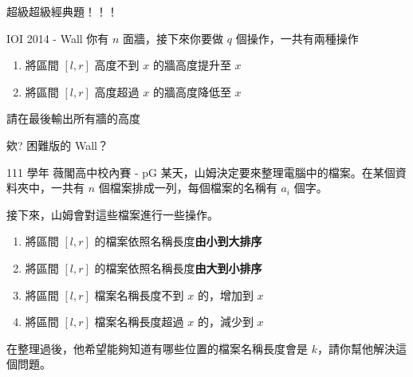 \documentclass[aspectratio=169]{beamer}
\begin{document}
    \begin{frame}{超級超級經典題！！！}
        \begin{block}{IOI 2014 - Wall}
            你有 $n$ 面牆，接下來你要做 $q$ 個操作，一共有兩種操作
            \begin{enumerate}
                \item 將區間 $[l,r]$ 高度不到 $x$ 的牆高度提升至 $x$
                \item 將區間 $[l,r]$ 高度超過 $x$ 的牆高度降低至 $x$
            \end{enumerate}
            請在最後輸出所有牆的高度
        \end{block}
    \end{frame}

    \begin{frame}{欸? 困難版的 Wall？}
        \begin{block}{111 學年 薇閣高中校內賽 - pG}
            某天，山姆決定要來整理電腦中的檔案。在某個資料夾中，一共有 $n$ 個檔案排成一列，每個檔案的名稱有 $a_i$ 個字。

            接下來，山姆會對這些檔案進行一些操作。
            
            \begin{enumerate}
            \item 將區間 $[l,r]$ 的檔案依照名稱長度\textbf{由小到大排序}
            \item 將區間 $[l,r]$ 的檔案依照名稱長度\textbf{由大到小排序}
            \item 將區間 $[l,r]$ 檔案名稱長度不到 $x$ 的，增加到 $x$
            \item 將區間 $[l,r]$ 檔案名稱長度超過 $x$ 的，減少到 $x$
            \end{enumerate}
            
            在整理過後，他希望能夠知道有哪些位置的檔案名稱長度會是 $k$，請你幫他解決這個問題。
        \end{block}
    \end{frame}
    
\end{document}
